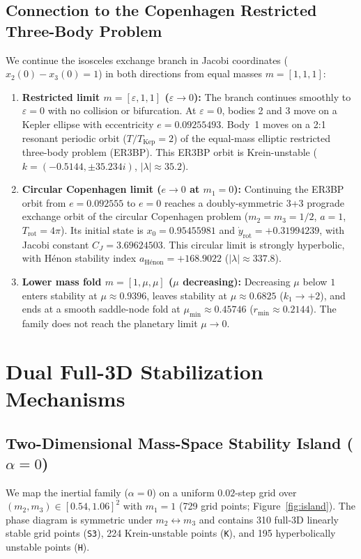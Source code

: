 \documentclass[11pt,a4paper]{article}
\begin{document}
\subsection{Connection to the Copenhagen Restricted Three-Body Problem}
We continue the isosceles exchange branch in Jacobi coordinates ($x_2(0) - x_3(0) = 1$) in both directions from equal masses $m = [1, 1, 1]$:
\begin{enumerate}
  \item \textbf{Restricted limit $m = [\varepsilon, 1, 1]$ ($\varepsilon \to 0$):} The branch continues smoothly to $\varepsilon = 0$ with no collision or bifurcation. At $\varepsilon = 0$, bodies 2 and 3 move on a Kepler ellipse with eccentricity $e = 0.09255493$. Body~1 moves on a 2:1 resonant periodic orbit ($T / T_{\text{Kep}} = 2$) of the equal-mass elliptic restricted three-body problem (ER3BP). This ER3BP orbit is Krein-unstable ($k = (-0.5144, \pm 35.234i)$, $|\lambda| \approx 35.2$).
  \item \textbf{Circular Copenhagen limit ($e \to 0$ at $m_1 = 0$):} Continuing the ER3BP orbit from $e = 0.092555$ to $e = 0$ reaches a doubly-symmetric 3+3 prograde exchange orbit of the circular Copenhagen problem \cite{Henon1965} ($m_2 = m_3 = 1/2$, $a = 1$, $T_{\text{rot}} = 4\pi$). Its initial state is $x_0 = 0.95455981$ and $\dot{y}_{\text{rot}} = +0.31994239$, with Jacobi constant $C_J = 3.69624503$. This circular limit is strongly hyperbolic, with H\'enon stability index $a_{\text{H\'enon}} = +168.9022$ ($|\lambda| \approx 337.8$).
  \item \textbf{Lower mass fold $m = [1, \mu, \mu]$ ($\mu$ decreasing):} Decreasing $\mu$ below $1$ enters stability at $\mu \approx 0.9396$, leaves stability at $\mu \approx 0.6825$ ($k_1 \to +2$), and ends at a smooth saddle-node fold at $\mu_{\min} \approx 0.45746$ ($r_{\min} \approx 0.2144$). The family does not reach the planetary limit $\mu \to 0$.
\end{enumerate}

\section{Dual Full-3D Stabilization Mechanisms}

\subsection{Two-Dimensional Mass-Space Stability Island ($\alpha = 0$)}
We map the inertial family ($\alpha = 0$) on a uniform $0.02$-step grid over $(m_2, m_3) \in [0.54, 1.06]^2$ with $m_1 = 1$ (729 grid points; Figure~\ref{fig:island}).
The phase diagram is symmetric under $m_2 \leftrightarrow m_3$ and contains 310 full-3D linearly stable grid points (\texttt{S3}), 224 Krein-unstable points (\texttt{K}), and 195 hyperbolically unstable points (\texttt{H}).
\end{document}
